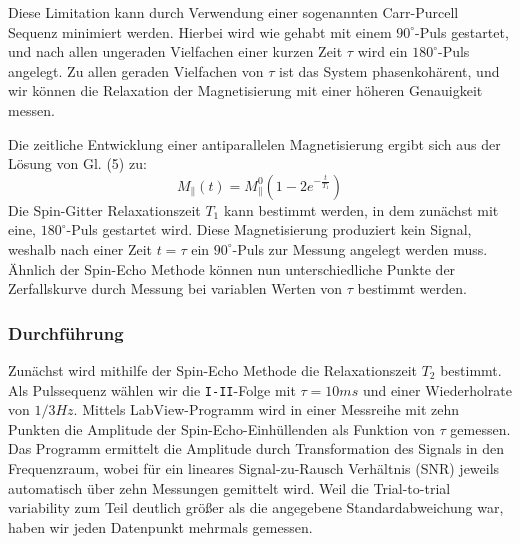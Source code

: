 \documentclass[a4paper]{scrartcl} %
\begin{document}
Diese Limitation kann durch Verwendung einer sogenannten Carr-Purcell Sequenz minimiert werden. Hierbei wird wie gehabt mit einem $90^\circ$-Puls gestartet, und nach allen ungeraden Vielfachen einer kurzen Zeit $\tau$ wird ein $180^\circ$-Puls angelegt. Zu allen geraden Vielfachen von $\tau$ ist das System phasenkohärent, und wir können die Relaxation der Magnetisierung mit einer höheren Genauigkeit messen.

Die zeitliche Entwicklung einer antiparallelen Magnetisierung ergibt sich aus der Lösung von Gl. (5) zu:
\begin{equation}
M_{\parallel}(t) = M_{\parallel}^0(1-2e^{-\frac{t}{T_1}})
\end{equation}
Die Spin-Gitter Relaxationszeit $T_1$ kann bestimmt werden, in dem zunächst mit eine, $180^\circ$-Puls gestartet wird. Diese Magnetisierung produziert kein Signal, weshalb nach einer Zeit $t=\tau$ ein $90^\circ$-Puls zur Messung angelegt werden muss. Ähnlich der Spin-Echo Methode können nun unterschiedliche Punkte der Zerfallskurve durch Messung bei variablen Werten von $\tau$ bestimmt werden.

\subsubsection{Durchführung}

Zunächst wird mithilfe der Spin-Echo Methode die Relaxationszeit $T_2$ bestimmt. Als Pulssequenz wählen wir die \texttt{I-II}-Folge mit $\tau = 10ms$ und einer Wiederholrate von $1/3Hz$. Mittels LabView-Programm wird in einer Messreihe mit zehn Punkten die Amplitude der Spin-Echo-Einhüllenden als Funktion von $\tau$ gemessen. Das Programm ermittelt die Amplitude durch Transformation des Signals in den Frequenzraum, wobei für ein lineares Signal-zu-Rausch Verhältnis (SNR) jeweils automatisch über zehn Messungen gemittelt wird. Weil die Trial-to-trial variability zum Teil deutlich größer als die angegebene Standardabweichung war, haben wir jeden Datenpunkt mehrmals gemessen.
\end{document}
